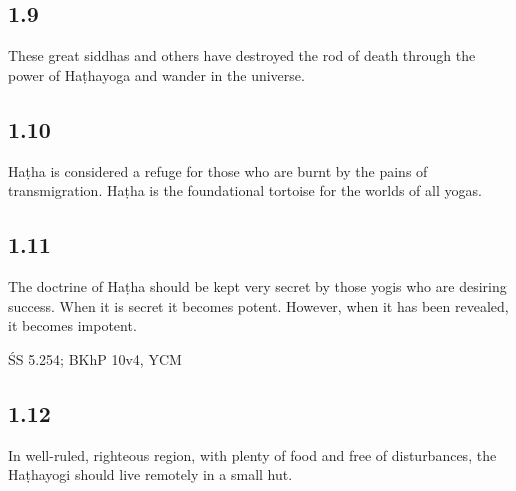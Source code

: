\begin{ekdosis}
\subsection*{1.9}
\begin{translation}[hp01_009]
These great siddhas and others have destroyed the rod of death through the power of Haṭhayoga and wander in the universe.
\end{translation}


\subsection*{1.10}
\begin{translation}[hp01_010]
Haṭha is considered a refuge for those who are burnt by the pains of transmigration. Haṭha is the foundational tortoise for the worlds of all yogas.
\end{translation}


\subsection*{1.11}
\begin{translation}[hp01_011]
The doctrine of Haṭha should be kept very secret by those yogis who are desiring success. When it is secret it becomes potent. However, when it has been revealed, it becomes impotent.
\end{translation}

\begin{sources}[hp01_011]
ŚS 5.254; BKhP 10v4, YCM
\end{sources}
 

\subsection*{1.12}
\begin{translation}[hp01_012]
In well-ruled, righteous region, with plenty of food and free of disturbances, the Haṭhayogi should live remotely in a small hut.
\end{translation}


\end{ekdosis}
